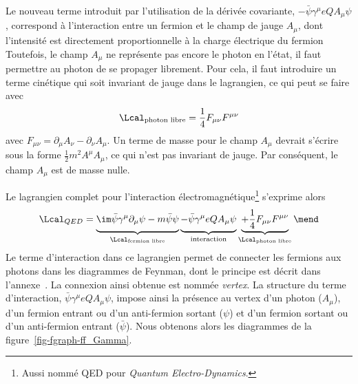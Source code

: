 \par Le nouveau terme introduit par l'utilisation de la dérivée covariante, $- \bar{\psi}\gamma^\mu eQA_\mu \psi$, correspond à l'interaction entre un fermion et le champ de jauge $A_\mu$, dont l'intensité est directement proportionnelle à la charge électrique du fermion
Toutefois, le champ $A_\mu$ ne représente pas encore le photon en l'état, il faut permettre au photon de se propager librement. Pour cela, il faut introduire un terme cinétique qui soit invariant de jauge dans le lagrangien, ce qui peut se faire avec
\begin{equation}
\Lcal_{\text{photon libre}} = \frac{1}{4} F_{\mu\nu}F^{\mu\nu}
\end{equation}
avec $F_{\mu\nu} = \partial_\mu A_\nu - \partial_\nu A_\mu$.
Un terme de masse pour le champ $A_\mu$ devrait s'écrire sous la forme $\frac{1}{2}m^2A^\mu A_\mu$, ce qui n'est pas invariant de jauge. Par conséquent, le champ $A_\mu$ est de masse nulle.
\par Le lagrangien complet pour l'interaction électromagnétique\footnote{Aussi nommé QED pour \emph{Quantum Electro-Dynamics}.} s'exprime alors
\begin{equation}
\Lcal_{QED} =
\underbrace{\im \bar{\psi} \gamma^\mu\partial_\mu \psi - m \bar{\psi}\psi \vphantom{\im \bar{\psi} \gamma^\mu\partial_\mu \psi - m \bar{\psi}\psi - \bar{\psi}\gamma^\mu eQA_\mu \psi + \frac{1}{4} F_{\mu\nu}F^{\mu\nu}}}_{\Lcal_{\text{fermion libre}}}
\underbrace{- \bar{\psi}\gamma^\mu eQA_\mu \psi \vphantom{\im \bar{\psi} \gamma^\mu\partial_\mu \psi - m \bar{\psi}\psi - \bar{\psi}\gamma^\mu eQA_\mu \psi + \frac{1}{4} F_{\mu\nu}F^{\mu\nu}}}_{\text{interaction}}
\underbrace{+ \frac{1}{4} F_{\mu\nu}F^{\mu\nu} \vphantom{\im \bar{\psi} \gamma^\mu\partial_\mu \psi - m \bar{\psi}\psi - \bar{\psi}\gamma^\mu eQA_\mu \psi + \frac{1}{4} F_{\mu\nu}F^{\mu\nu}}}_{\Lcal_{\text{photon libre}}}
\mend
\end{equation}
Le terme d'interaction dans ce lagrangien permet de \og connecter \fg{} les fermions aux photons dans les diagrammes de Feynman, dont le principe est décrit dans l'annexe~.
La \og connexion \fg{} ainsi obtenue est nommée \emph{vertex}.
La structure du terme d'interaction, $\bar{\psi}\gamma^\mu eQA_\mu \psi$, impose ainsi la présence au vertex d'un photon ($A_\mu$), d'un fermion entrant ou d'un anti-fermion sortant ($\psi$) et d'un fermion sortant ou d'un anti-fermion entrant ($\bar{\psi}$). Nous obtenons alors les diagrammes de la figure~\ref{fig-fgraph-ff_Gamma}.
